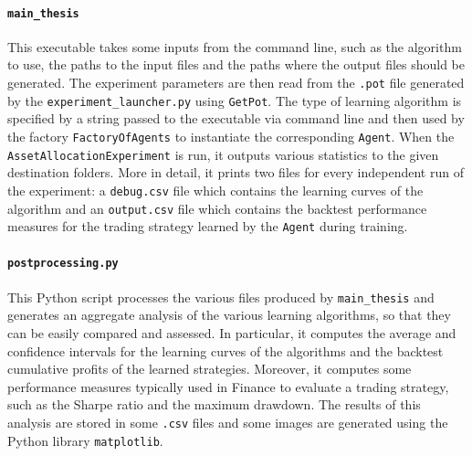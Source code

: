 \paragraph{\lstinline{main_thesis}} This executable takes some inputs from the command line, such as the algorithm to use, the paths to the input files and the paths where the output files should be generated. The experiment parameters are then read from the \lstinline{.pot} file generated by the \lstinline{experiment_launcher.py} using \lstinline{GetPot}. The type of learning algorithm is specified by a string passed to the executable via command line and then used by the factory \lstinline{FactoryOfAgents} to instantiate the corresponding \lstinline{Agent}. When the \lstinline{AssetAllocationExperiment} is run, it outputs various statistics to the given destination folders. More in detail, it prints two files for every independent run of the experiment: a \lstinline{debug.csv} file which contains the learning curves of the algorithm and an \lstinline{output.csv} file which contains the backtest performance measures for the trading strategy learned by the \lstinline{Agent} during training.   

\paragraph{\lstinline{postprocessing.py}} This Python script processes the various files produced by \lstinline{main_thesis} and generates an aggregate analysis of the various learning algorithms, so that they can be easily compared and assessed. In particular, it computes the average and confidence intervals for the learning curves of the algorithms and the backtest cumulative profits of the learned strategies. Moreover, it computes some performance measures typically used in Finance to evaluate a trading strategy, such as the Sharpe ratio and the maximum drawdown. The results of this analysis are stored in some \lstinline{.csv} files and some images are generated using the Python library \lstinline{matplotlib}. 


